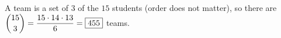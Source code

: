 A team is a set of $3$ of the $15$ students (order does not matter), so there are $\dbinom{15}{3}=\dfrac{15\cdot14\cdot13}{6}=\boxed{455}$ teams.
